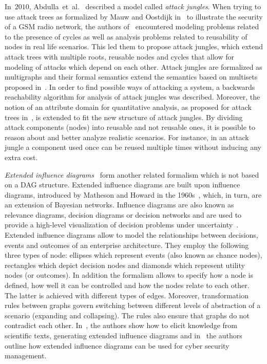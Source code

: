 \documentclass[a4paper]{article}
\begin{document}
In~$2010$, Abdulla~et~al.~\cite{AbCeKa} described a model called \emph{attack 
jungles}. When trying to use attack trees as formalized by Mauw and Oostdijk 
in~\cite{MaOo} to illustrate the security of a GSM radio network, the authors 
of~\cite{AbCeKa} encountered modeling problems related to the presence of 
cycles as well as analysis problems related to reusability of nodes in real 
life scenarios. This led them to propose attack jungles, which extend attack 
trees with multiple roots, reusable nodes and cycles that allow for modeling  of
attacks which depend on each other. Attack jungles are formalized as 
multigraphs and their formal semantics extend the semantics based on multisets 
proposed in~\cite{MaOo}. In order to find possible ways of attacking a system, 
a backwards reachability algorithm for analysis of attack jungles was 
described. Moreover, the notion of an attribute domain for quantitative 
analysis, as proposed for attack trees in~\cite{MaOo}, is extended to fit the 
new structure of attack jungles. By dividing attack components (nodes)  into
reusable and not reusable ones, it is possible to reason about and better 
analyze realistic scenarios. For instance, in an attack jungle a component  used
once can be reused multiple times without inducing any extra cost. 

\emph{Extended influence diagrams}~\cite{JoLaNaSi} form another related
formalism which is not based on a DAG structure. Extended influence diagrams are
built upon influence diagrams, introduced by Matheson and Howard in the
1960s~\cite{MaHo}, which, in turn, are an extension of Bayesian networks. 
Influence diagrams are also known as relevance diagrams, decision diagrams or
decision networks and are used to provide a high-level visualization of decision
problems under uncertainty~\cite{EzBe2010}. Extended influence diagrams allow to
model the relationships between decisions, events and outcomes of an enterprise
architecture. They employ the following three types of node: ellipses which
represent events (also known as chance nodes), rectangles which depict decision
nodes and diamonds which represent utility nodes (or outcomes). In addition the
formalism allows to specify how a node is defined, how well it can be controlled
and how the nodes relate to each other. The latter is achieved with different
types of edges. Moreover, transformation rules between graphs govern switching
between different levels of abstraction of a scenario (expanding and
collapsing). The rules also ensure that graphs do not contradict each other.
In~\cite{LaJoNa}, the authors show how to elicit knowledge from scientific
texts, generating extended influence diagrams and in~\cite{EkSo} the authors
outline how extended influence diagrams can be used for cyber security
management.
\end{document}
